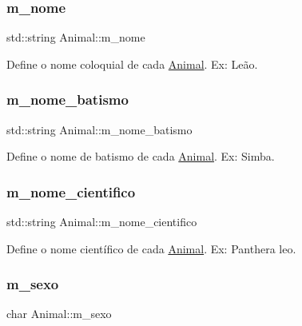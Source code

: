 \subsubsection{\texorpdfstring{m\+\_\+nome}{m\_nome}}
{\footnotesize\ttfamily std\+::string Animal\+::m\+\_\+nome\hspace{0.3cm}{\ttfamily [protected]}}

Define o nome coloquial de cada \hyperlink{classAnimal}{Animal}. Ex\+: Leão. \mbox{\label{classAnimal_aa9717b7e2de07af7118050ca1c10d0b5}} 
\subsubsection{\texorpdfstring{m\+\_\+nome\+\_\+batismo}{m\_nome\_batismo}}
{\footnotesize\ttfamily std\+::string Animal\+::m\+\_\+nome\+\_\+batismo\hspace{0.3cm}{\ttfamily [protected]}}

Define o nome de batismo de cada \hyperlink{classAnimal}{Animal}. Ex\+: Simba. \mbox{\label{classAnimal_af90a04b32166b6815617cfd4033da1e4}} 
\subsubsection{\texorpdfstring{m\+\_\+nome\+\_\+cientifico}{m\_nome\_cientifico}}
{\footnotesize\ttfamily std\+::string Animal\+::m\+\_\+nome\+\_\+cientifico\hspace{0.3cm}{\ttfamily [protected]}}

Define o nome científico de cada \hyperlink{classAnimal}{Animal}. Ex\+: Panthera leo. \mbox{\label{classAnimal_aaa6d77e661ed0fa9a33500588c8acfef}} 
\subsubsection{\texorpdfstring{m\+\_\+sexo}{m\_sexo}}
{\footnotesize\ttfamily char Animal\+::m\+\_\+sexo\hspace{0.3cm}{\ttfamily [protected]}}

